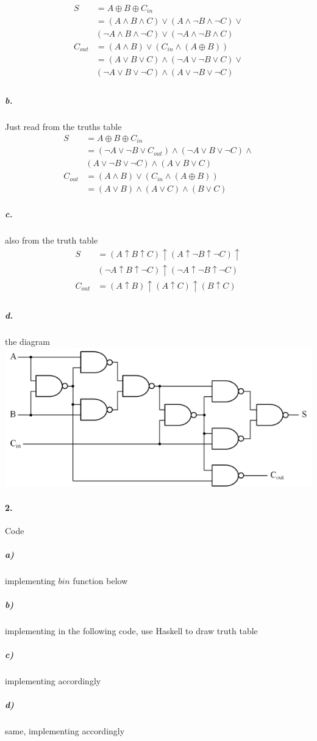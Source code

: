 \documentclass{article}
\begin{document}
\begin{align*}
    S &= A \oplus B \oplus C_{in} \\
    &= (A \land B \land C) \lor  (A \land \neg B \land \neg C) \lor \\
    &(\neg A \land B \land \neg C) \lor (\neg A \land \neg B \land C) \\
    C_{out} &= (A \land B) \lor (C_{in} \land (A \oplus B)) \\
    &=(A \lor B \lor C) \land (\neg A \lor \neg B \lor C) \lor \\
    &(\neg A \lor B \lor \neg C) \land (A \lor \neg B \lor \neg C) \\
\end{align*}
\subparagraph{b.}
Just read from the truths table
\begin{align*}
    S &= A \oplus B \oplus C_{in} \\
    &= (\neg A \lor \neg B \lor C_{out}) \land (\neg A \lor B \lor \neg C) \land \\
    &(A \lor \neg B \lor \neg C) \land (A \lor B \lor C) \\
    C_{out} &= (A \land B) \lor (C_{in} \land (A \oplus B)) \\
    &= (A \lor B) \land (A \lor C) \land (B \lor C)
\end{align*}
\subparagraph{c.}
also from the truth table
\begin{align*}
    S &= (A \uparrow B \uparrow C) \uparrow (A \uparrow \neg B \uparrow \neg C) \uparrow \\
    &(\neg A \uparrow B \uparrow \neg C) \uparrow (\neg A \uparrow \neg B \uparrow \neg C) \\
    C_{out} &= (A \uparrow B) \uparrow (A \uparrow C) \uparrow (B \uparrow C) \\
\end{align*}
\subparagraph{d.}
the diagram\\
\includegraphics[scale=0.5]{full_adder.png}
\paragraph{2.} Code
\subparagraph{a)} implementing $bin$ function below
\subparagraph{b)} implementing in the following code, use Haskell to draw truth table
\subparagraph{c)} implementing accordingly
\subparagraph{d)} same, implementing accordingly
\inputminted{Haskell}{code.hs}
\end{document}
